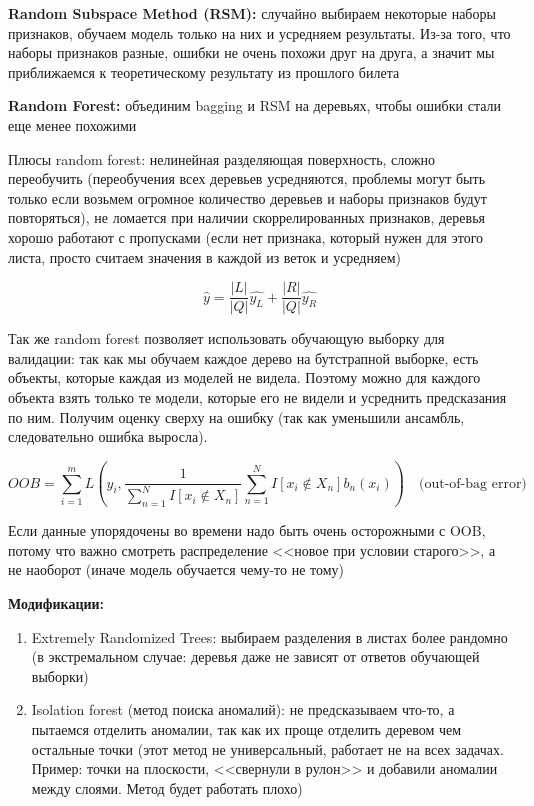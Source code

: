 \textbf{Random Subspace Method (RSM):} случайно выбираем некоторые наборы признаков, обучаем модель только на них и усредняем результаты. Из-за того, что наборы признаков разные, ошибки не очень похожи друг на друга, а значит мы приближаемся к теоретическому результату из прошлого билета

\textbf{Random Forest:} объединим bagging и RSM на деревьях, чтобы ошибки стали еще менее похожими

Плюсы random forest: нелинейная разделяющая поверхность, сложно переобучить (переобучения всех деревьев усредняются, проблемы могут быть только если возьмем огромное количество деревьев и наборы признаков будут повторяться), не ломается при наличии скоррелированных признаков, деревья хорошо работают с пропусками (если нет признака, который нужен для этого листа, просто считаем значения в каждой из веток и усредняем)

\[ \hat{y} = \frac{|L|}{|Q|} \hat{y_L} + \frac{|R|}{|Q|} \hat{y_R}\]

Так же random forest позволяет использовать обучающую выборку для валидации: так как мы обучаем каждое дерево на бутстрапной выборке, есть объекты, которые каждая из моделей не видела. Поэтому можно для каждого объекта взять только те модели, которые его не видели и усреднить предсказания по ним. Получим оценку сверху на ошибку (так как уменьшили ансамбль, следовательно ошибка выросла).

\[ OOB = \sum_{i=1}^m L\left(y_i, \frac 1 {\sum_{n=1}^N I[x_i \not\in X_n]} \sum_{n=1}^N I[x_i \not\in X_n] b_n(x_i)\right) \quad \text{(out-of-bag error)} \]

\begin{lemmanote}
    Если данные упорядочены во времени надо быть очень осторожными с OOB, потому что важно смотреть распределение <<новое при условии старого>>, а не наоборот (иначе модель обучается чему-то не тому)
\end{lemmanote}
\textbf{Модификации:}
\begin{enumerate}
    \item Extremely Randomized Trees: выбираем разделения в листах более рандомно (в экстремальном случае: деревья даже не зависят от ответов обучающей выборки)

    \item Isolation forest (метод поиска аномалий): не предсказываем что-то, а пытаемся отделить аномалии, так как их проще отделить деревом чем остальные точки (этот метод не универсальный, работает не на всех задачах. Пример: точки на плоскости, <<свернули в рулон>> и добавили аномалии между слоями. Метод будет работать плохо)
\end{enumerate}